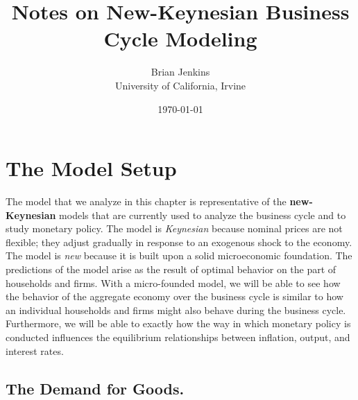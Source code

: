 \documentclass[12pt,fleqn]{article}
\begin{document}
\title{Notes on New-Keynesian Business Cycle Modeling}
\author{
Brian Jenkins\\  University of California, Irvine}
\date{\today}

\maketitle


\newpage
\tableofcontents

\cleardoublepage
{}
\listoffigures

\cleardoublepage
{}
\listoftables

\newpage
\section{The Model Setup}

The model that we analyze in this chapter is representative of the \textbf{new-Keynesian} models that are currently used to analyze the business cycle and to study monetary policy. The model is \emph{Keynesian} because nominal prices are not flexible; they adjust gradually in response to an exogenous shock to the economy. The model is \emph{new} because it is built upon a solid microeconomic foundation. The predictions of the model arise as the result of optimal behavior on the part of households and firms. With a micro-founded model, we will be able to see how the behavior of the aggregate economy over the business cycle is similar to how an individual households and firms might also behave during the business cycle. Furthermore, we will be able to exactly how the way in which monetary policy is conducted influences the equilibrium relationships between inflation, output, and interest rates.

\subsection{The Demand for Goods.}
\end{document}
